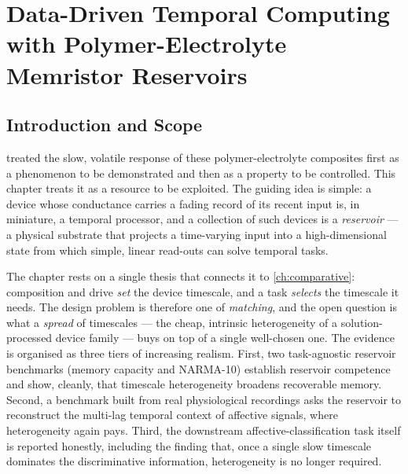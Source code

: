 \documentclass[12pt, twoside]{report}
\begin{document}
  \setcounter{chapter}{3}     %
\fi

\providecommand{\SY}{\textit{Super Yellow}}
\providecommand{\PEO}{PEO}
\providecommand{\LiTf}{LiOTf}
\providecommand{\NaTf}{NaOTf}
\providecommand{\KTf}{KOTf}
\providecommand{\twoterminal}{two-terminal}
\providecommand{\WESAD}{\textsc{wesad}}
\providecommand{\NARMA}{NARMA-10}

\chapter{Data-Driven Temporal Computing with Polymer-Electrolyte Memristor Reservoirs}\label{ch:temporal}

\section{Introduction and Scope}\label{sec:ch4_intro}

 treated the slow, volatile response of these polymer-electrolyte composites first as a phenomenon to be demonstrated and then as a property to be controlled. This chapter treats it as a resource to be exploited. The guiding idea is simple: a device whose conductance carries a fading record of its recent input is, in miniature, a temporal processor, and a collection of such devices is a \emph{reservoir} --- a physical substrate that projects a time-varying input into a high-dimensional state from which simple, linear read-outs can solve temporal tasks.

The chapter rests on a single thesis that connects it to \cref{ch:comparative}: composition and drive \emph{set} the device timescale, and a task \emph{selects} the timescale it needs. The design problem is therefore one of \emph{matching}, and the open question is what a \emph{spread} of timescales --- the cheap, intrinsic heterogeneity of a solution-processed device family --- buys on top of a single well-chosen one. The evidence is organised as three tiers of increasing realism. First, two task-agnostic reservoir benchmarks (memory capacity and \NARMA{}) establish reservoir competence and show, cleanly, that timescale heterogeneity broadens recoverable memory. Second, a benchmark built from real physiological recordings asks the reservoir to reconstruct the multi-lag temporal context of affective signals, where heterogeneity again pays. Third, the downstream affective-classification task itself is reported honestly, including the finding that, once a single slow timescale dominates the discriminative information, heterogeneity is no longer required.
\end{document}
